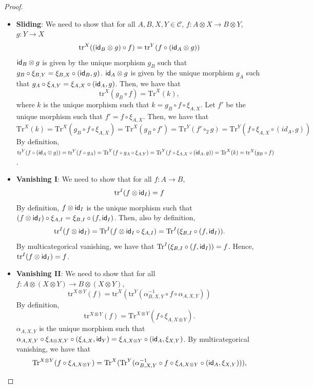 \begin{example}
\begin{proof}
\begin{itemize}
\[    \]
    \item \textbf{Sliding}: We need to show that for all $A,B,X,Y \in \mathcal{C}$, $f : A \otimes X \to B \otimes Y$, $g : Y \to X$
    \[
    \text{tr}^{X}((\textsf{id}_{B} \otimes g) \circ f) = \text{tr}^{Y}(f \circ (\textsf{id}_{A} \otimes g))
    \]
    $\textsf{id}_{B} \otimes g$ is given by the unique morphism $g_{B}$ such that $g_{B} \circ \xi_{B,Y} = \xi_{B,X} \circ (\textsf{id}_{B}, g)$.
    $\textsf{id}_{A} \otimes g$ is given by the unique morphism $g_{A}$ such that $g_{A} \circ \xi_{A,Y} = \xi_{A,X} \circ (\textsf{id}_{A}, g)$.
    Then, we have that
    \[
    \text{tr}^{X}(g_{B} \circ f) = \text{Tr}^{X}(k),
    \]
    where $k$ is the unique morphism such that $k = g_{B} \circ f \circ \xi_{A,X}$.
    Let $f'$ be the unique morphism such that $f' = f \circ \xi_{A,X}$.
    Then, we have that
    \[
    \text{Tr}^{X}(k) = \text{Tr}^{X}(g_{B} \circ f \circ \xi_{A,X}) = \text{Tr}^{X}(g_{B} \circ f') = \text{Tr}^{Y}(f' \circ_{2} g) = \text{Tr}^{Y}(f \circ \xi_{A,X} \circ (id_{A}, g))
    \]
    By definition, $\text{tr}^{Y}(f \circ (\textsf{id}_{A} \otimes g)) = \text{tr}^{Y}(f \circ g_{A}) = \text{Tr}^{Y}(f \circ g_{A} \circ \xi_{A,Y}) = \text{Tr}^{Y}(f \circ \xi_{A,X} \circ (\textsf{id}_{A},g)) = \text{Tr}^{X}(k) = \text{tr}^{X}(g_{B} \circ f)$.
    \item \textbf{Vanishing I}: We need to show that for all $f : A \to B$,
    \[
    \text{tr}^{I}(f \otimes \textsf{id}_{I}) = f
    \]
    By definition, $f \otimes \textsf{id}_{I}$ is the unique morphism such that $(f \otimes \textsf{id}_{I}) \circ \xi_{A,I} = \xi_{B,I} \circ (f, \textsf{id}_{I})$.
    Then, also by definition,
    \[
    \text{tr}^{I}(f \otimes \textsf{id}_{I}) = \text{Tr}^{I}(f \otimes \textsf{id}_{I} \circ \xi_{A,I}) = \text{Tr}^{I}(\xi_{B,I} \circ (f, \textsf{id}_{I})).
    \]
    By multicategorical vanishing, we have that $\text{Tr}^{I}(\xi_{B,I} \circ (f, \textsf{id}_{I})) = f$.
    Hence, $\text{tr}^{I}(f \otimes \textsf{id}_{I}) = f$.
    \item \textbf{Vanishing II}: We need to show that for all $f : A \otimes (X \otimes Y) \to B \otimes (X \otimes Y)$,
    \[
    \text{tr}^{X \otimes Y}(f) = \text{tr}^{X}(\text{tr}^{Y}(\alpha_{B,X,Y}^{-1} \circ f \circ \alpha_{A,X,Y}))
    \]
    By definition, 
    \[
    \text{tr}^{X \otimes Y}(f) = \text{Tr}^{X \otimes Y}(f \circ \xi_{A, X \otimes Y}).
    \]
    $\alpha_{A,X,Y}$ is the unique morphism such that $\alpha_{A,X,Y} \circ \xi_{A \otimes X, Y} \circ (\xi_{A,X}, \textsf{id}_{Y}) = \xi_{A, X \otimes Y} \circ (\textsf{id}_{A}, \xi_{X,Y})$.
    By multicategorical vanishing, we have that
    \[
    \text{Tr}^{X \otimes Y}(f \circ \xi_{A, X \otimes Y}) = \text{Tr}^{X}(\text{Tr}^{Y}(\alpha_{B,X,Y}^{-1} \circ f \circ \xi_{A, X \otimes Y} \circ (\textsf{id}_{A}, \xi_{X,Y}))),
\]
\end{itemize}
\end{proof}
\end{example}
